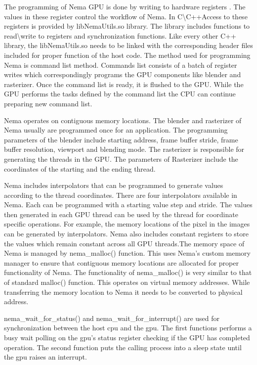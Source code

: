 The programming of Nema GPU is done by writing to hardware registers \cite{Apostolou2015}. The values in these register control the workflow of Nema. In C\textbackslash C++Access to these registers is provided by libNemaUtils.so library. The library includes functions to read\textbackslash write to registers and synchronization functions. Like every other C++ library, the libNemaUtils.so needs to be linked with the corresponding header files included for proper function of the host code. The method used for programming Nema is command list method. Commands list consists of a batch of register writes which correspondingly programs the GPU components like blender and rasterizer. Once the command list is ready, it is flushed to the GPU. While the GPU performs the tasks defined by the command list the CPU can continue preparing new command list.

Nema operates on contiguous memory locations. The blender and rasterizer of Nema usually are programmed once for an application. The programming parameters of the blender include starting address, frame buffer stride, frame buffer resolution, viewport and blending mode. The rasterizer is responsible for generating the threads in the GPU. The parameters of Rasterizer include the coordinates of the starting and the ending thread.

Nema includes interpolators that can be programmed to generate values according to the thread coordinates. There are four interpolators available in Nema. Each can be programmed with a starting value step and stride. The values then generated in each GPU thread can be used by the thread for coordinate specific operations. For example, the memory locations of the pixel in the images can be generated by interpolators. Nema also includes constant registers to store the values which remain constant across all GPU threads.The memory space of Nema is managed by nema\_malloc() function. This uses Nema's custom memory manager to ensure that contiguous memory locations are allocated for proper functionality of Nema. The functionality of nema\_malloc() is very similar to that of standard malloc() function. This operates on virtual memory addresses. While transferring the memory location to Nema it needs to be converted to physical address.

nema\_wait\_for\_status() and nema\_wait\_for\_interrupt() are used for synchronization between the host cpu and the gpu. The first functions performs a busy wait polling on the gpu's status register checking if the GPU has completed operation. The second function puts the calling process into a sleep state until the gpu
 raises an interrupt.

